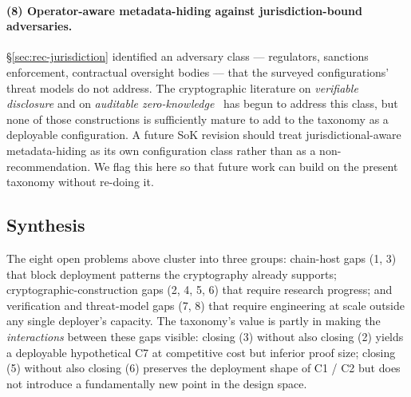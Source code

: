 \paragraph{(8) Operator-aware metadata-hiding against
jurisdiction-bound adversaries.} \S\ref{sec:rec-jurisdiction}
identified an adversary class --- regulators, sanctions enforcement,
contractual oversight bodies --- that the surveyed configurations'
threat models do not address. The cryptographic literature on
\emph{verifiable disclosure} and on \emph{auditable
zero-knowledge}~\cite{don-2019-fiat-shamir} has begun to address this
class, but none of those constructions is sufficiently mature to add
to the taxonomy as a deployable configuration. A future SoK revision
should treat jurisdictional-aware metadata-hiding as its own
configuration class rather than as a non-recommendation. We flag
this here so that future work can build on the present taxonomy
without re-doing it.

\subsection{Synthesis}

The eight open problems above cluster into three groups: chain-host
gaps (1, 3) that block deployment patterns the cryptography already
supports; cryptographic-construction gaps (2, 4, 5, 6) that require
research progress; and verification and threat-model gaps (7, 8) that
require engineering at scale outside any single deployer's
capacity. The taxonomy's value is partly in making the
\emph{interactions} between these gaps visible: closing (3) without
also closing (2) yields a deployable hypothetical C7 at competitive
cost but inferior proof size; closing (5) without also closing (6)
preserves the deployment shape of C1 / C2 but does not introduce a
fundamentally new point in the design space.
